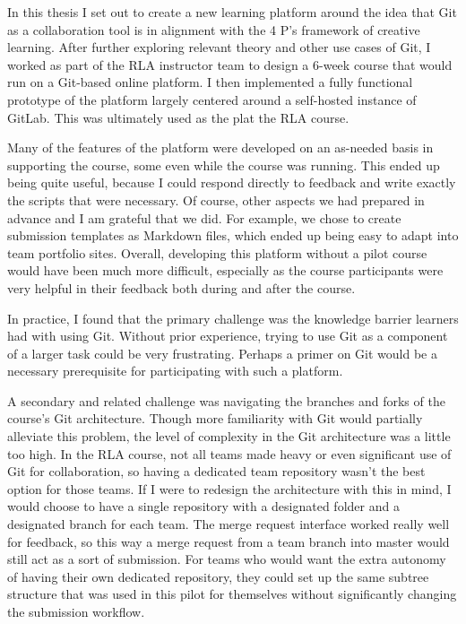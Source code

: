 \documentclass[12pt,twoside]{mitthesis}
\newcommand{\review}[1]{{#1}}
\begin{document}
\review{In this thesis I set out to create a new learning platform around the idea that Git as a collaboration tool is in alignment with the 4 P's framework of creative learning. After further exploring relevant theory and other use cases of Git, I worked as part of the RLA instructor team to design a 6-week course that would run on a Git-based online platform. I then implemented a fully functional prototype of the platform largely centered around a self-hosted instance of GitLab. This was ultimately used as the plat the RLA course.

Many of the features of the platform were developed on an as-needed basis in supporting the course, some even while the course was running. This ended up being quite useful, because I could respond directly to feedback and write exactly the scripts that were necessary. Of course, other aspects we had prepared in advance and I am grateful that we did. For example, we chose to create submission templates as Markdown files, which ended up being easy to adapt into team portfolio sites. Overall, developing this platform without a pilot course would have been much more difficult, especially as the course participants were very helpful in their feedback both during and after the course.

In practice, I found that the primary challenge was the knowledge barrier learners had with using Git. Without prior experience, trying to use Git as a component of a larger task could be very frustrating. Perhaps a primer on Git would be a necessary prerequisite for participating with such a platform. 

A secondary and related challenge was navigating the branches and forks of the course's Git architecture. Though more familiarity with Git would partially alleviate this problem, the level of complexity in the Git architecture was a little too high. In the RLA course, not all teams made heavy or even significant use of Git for collaboration, so having a dedicated team repository wasn't the best option for those teams. If I were to redesign the architecture with this in mind, I would choose to have a single repository with a designated folder and a designated branch for each team. The merge request interface worked really well for feedback, so this way a merge request from a team branch into master would still act as a sort of submission. For teams who would want the extra autonomy of having their own dedicated repository, they could set up the same subtree structure that was used in this pilot for themselves without significantly changing the submission workflow.

}
\end{document}
